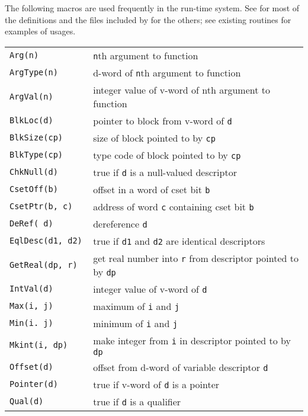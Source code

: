 The following macros are used frequently in the run-time system.  See
 for most of the definitions and the files included by
 for the others; see existing routines for examples of
usages.\\[0.5cm]
{\renewcommand{\arraystretch}{0.9}%
\begin{xtabular}{>{\hspace{1cm}\texttt\bgroup}l<{\egroup}@{\hspace{1cm}}p{11cm}}
Arg(n)            & \hspace{0cm}\texttt{n}th argument to function\\
ArgType(n)        & d-word of \texttt{n}th argument to function\\
ArgVal(n)         & integer value of v-word of nth argument to function\\
BlkLoc(d)         & pointer to block from v-word of \texttt{d}\\
BlkSize(cp)       & size of block pointed to by \texttt{cp}\\
BlkType(cp)       & type code of block pointed to by \texttt{cp}\\
ChkNull(d)        & true if \texttt{d} is a null-valued descriptor\\
CsetOff(b)        & offset in a word of cset bit \texttt{b}\\
CsetPtr(b, c)     & address of word \texttt{c} containing cset bit \texttt{b}\\
DeRef( d)         & dereference \texttt{d}\\
EqlDesc(d1, d2)   & true if \texttt{d1} and \texttt{d2} are identical descriptors\\
GetReal(dp, r)    & get real number into \texttt{r} from
                    descriptor pointed to by \texttt{dp}\\
IntVal(d)         & integer value of v-word of \texttt{d}\\
Max(i, j)         & maximum of \texttt{i} and \texttt{j}\\
Min(i. j)         & minimum of \texttt{i} and \texttt{j}\\
Mkint(i, dp)      & make integer from \texttt{i} in descriptor
                    pointed to by \texttt{dp}\\
Offset(d)         & offset from d-word of variable descriptor \texttt{d}\\
Pointer(d)        & true if v-word of \texttt{d} is a pointer\\
Qual(d)           & true if \texttt{d} is a qualifier\\

\end{xtabular}}
